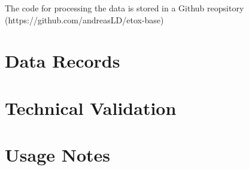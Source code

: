 \documentclass[english]{article}
\newcommand{\git}{https://github.com/andreasLD/etox-base}
\begin{document}
The code for processing the data is stored in a Github reopsitory (\git{})


\section*{Data Records}



\section*{Technical Validation}


\section*{Usage Notes}
\end{document}
